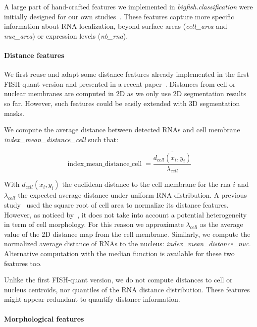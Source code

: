 A large part of hand-crafted features we implemented in \emph{bigfish.classification} were initially designed for our own studies~\cite{CHOUAIB_2020,safieddine_choreography_2021,pichon_kinesin_2021}.
These features capture more specific information about \ac{RNA} localization, beyond surface areas (\emph{cell\_area} and \emph{nuc\_area}) or expression levels (\emph{nb\_rna}).

\paragraph{Distance features}

We first reuse and adapt some distance features already implemented in the first FISH-quant version and presented in a recent paper~\cite{samacoits_computational_2018}.
Distances from cell or nuclear membranes are computed in 2D as we only use 2D segmentation results so far.
However, such features could be easily extended with 3D segmentation masks.

We compute the average distance between detected \ac{RNA}s and cell membrane \emph{index\_mean\_distance\_cell} such that:

\begin{equation}
	{\displaystyle \operatorname{index\_mean\_distance\_cell} = \frac{\overline{d_{cell}(x_i, y_i)}}{\lambda_{cell}}}
\end{equation}

\noindent
With $d_{cell}(x_i, y_i)$ the euclidean distance to the cell membrane for the rna $i$ and $\lambda_{cell}$ the expected average distance under uniform \ac{RNA} distribution.
A previous study~\cite{battich_control_2015} used the square root of cell area to normalize its distance features.
However, as noticed by~\cite{samacoits_computational_2018}, it does not take into account a potential heterogeneity in term of cell morphology.
For this reason we approximate $\lambda_{cell}$ as the average value of the 2D distance map from the cell membrane.
Similarly, we compute the normalized average distance of \ac{RNA}s to the nucleus: \emph{index\_mean\_distance\_nuc}.
Alternative computation with the median function is available for these two features too.

Unlike the first FISH-quant version, we do not compute distances to cell or nucleus centroids, nor quantiles of the \ac{RNA} distance distribution.
These features might appear redundant to quantify distance information.

\paragraph{Morphological features}

